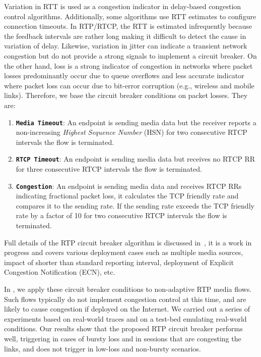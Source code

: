 Variation in RTT is used as a congestion indicator in delay-based congestion
control  algorithms. Additionally, some algorithms use RTT estimates to
configure connection timeouts. In RTP/RTCP, the RTT is estimated infrequently
because the feedback intervals are rather long making it difficult to detect
the cause in  variation of delay. Likewise, variation in jitter can indicate a
transient network congestion but do not  provide a strong signals to implement
a circuit breaker. On the other hand, loss is a strong indicator of congestion
in networks where  packet losses predominantly occur due to queue overflows
and less accurate indicator where packet loss can occur due to bit-error
corruption (e.g., wireless  and mobile links). Therefore, we base the circuit
breaker conditions on packet losses. They are:

\begin{enumerate}
\setlength{\itemsep}{5pt}

\item \textbf{\texttt{Media Timeout}}: An endpoint is sending media data but
the receiver reports a non-increasing \emph{Highest Sequence Number} (HSN) for
two consecutive RTCP intervals the flow is terminated.

\item \textbf{\texttt{RTCP Timeout}}: An endpoint is sending media data but
receives no RTCP RR for three consecutive RTCP intervals the flow is
terminated.

\item \textbf{\texttt{Congestion}}: An endpoint is sending media data and
receives RTCP RRs indicating fractional packet loss, it calculates the TCP
friendly rate and compares it to the sending rate. If the sending rate exceeds
the TCP friendly rate  by a factor of 10 for two consecutive RTCP intervals
the flow is terminated.

\end{enumerate}

Full details of the RTP circuit breaker algorithm is discussed
in~\cite{draft.rtp.cb}, it is a work in progress and covers various deployment
cases such as multiple media sources, impact of shorter than standard
reporting interval, deployment of Explicit Congestion Notification (ECN), etc.

In , we apply these circuit breaker conditions to non-adaptive
RTP media flows. Such flows typically do not implement congestion control at
this time, and are likely to cause congestion if deployed on the Internet. We
carried out a series of experiments based on real-world traces and on a
test-bed emulating real-world conditions. Our results show that the proposed
RTP circuit breaker performs well, triggering in cases of bursty loss and in
sessions that are congesting the links, and does not trigger in low-loss and
non-bursty scenarios. 

